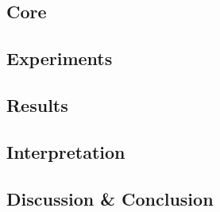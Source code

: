 \documentclass{article}
\begin{document}
\begin{multicols}{2}
\subsection*{Core}
\subsection*{Experiments}
\subsection*{Results}
\subsection*{Interpretation}

\subsection*{Discussion \& Conclusion}



\end{multicols}
\end{document}
